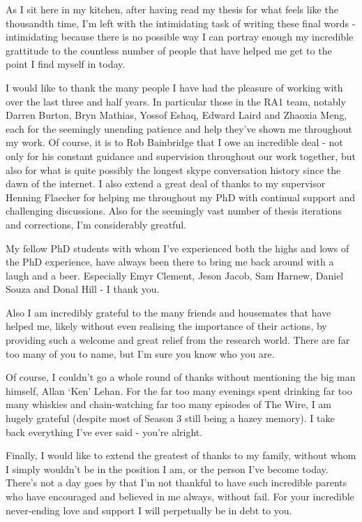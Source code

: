 
\begin{acknowledgements}      

\begin{spacing}{1}
As I sit here in my kitchen, after having read my thesis for what feels like
the
thousandth time, I'm left with the intimidating task of writing these final
words - intimidating because there is no possible way I can portray enough my
incredible grattitude to the countless number of people that have helped me
get to the point I find myself in today.

I would like to thank the many people I have had the pleasure of working with
over the last three and half years. In particular those in
the RA1 team, notably Darren Burton, Bryn Mathias, Yossof Eshaq, Edward
Laird and Zhaoxia Meng, each for the seemingly unending patience and help
they've shown me throughout my work. Of course, it is to Rob Bainbridge that I
owe an incredible deal - not only for his constant guidance and supervision
throughout our work together, but also for what is quite possibly the longest
skype conversation history since the dawn of the internet.
I also extend a great deal of thanks to my supervisor Henning Flaecher for
helping me throughout my PhD with continual support and challenging discussions.
Also for the seemingly vast number of thesis iterations and corrections, I'm
considerably greatful.

My fellow PhD students with whom I've experienced both the highs and lows of
the PhD experience, have always been there to bring me back around with a laugh
and a beer. Especially Emyr Clement, Jeson Jacob, Sam Harnew, Daniel Souza and
Donal Hill - I thank you.

Also I am incredibly grateful to the many friends and housemates that have helped me, likely without
even realising the importance of their actions, by
providing such a welcome and great relief from the research world. There are
far too many of you to name, but I'm sure you know who you are.

Of course, I couldn't go a whole round of thanks without mentioning the big man
himself, Allan `Ken' Lehan. For the far too many evenings spent
drinking far too many whiskies and chain-watching far too many episodes of The
Wire, I am hugely grateful (despite most of Season 3 still being a hazey
memory). I take back everything I've ever said - you're alright.

Finally, I would like to extend the greatest of thanks to my family, without whom
I simply wouldn't be in the position I am, or the person I've become today.
There's not a day goes by that I'm not thankful to have such incredible parents
who have encouraged and believed in me always, without fail.
For your incredible never-ending love and support I will perpetually be in debt
to you.
\end{spacing}

\end{acknowledgements}

